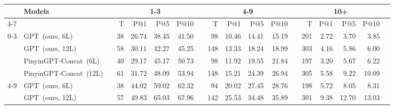 \begin{table*}[!htp]
\scriptsize
\begin{tabular}{llrrrrrrrrrrrrrrrr}\toprule
&\multirow{3}{*}{Models} & &\multicolumn{4}{c}{1-3} & &\multicolumn{4}{c}{4-9} & &\multicolumn{4}{c}{10+} \\\cmidrule{4-7}\cmidrule{9-12}\cmidrule{14-17}
& & &T &P@1 &P@5 &P@10 & &T &P@1 &P@5 &P@10 & &T &P@1 &P@5 &P@10 \\\midrule
\multirow{4}{*}{0-3} &GPT~(ours, 6L) & &38 &26.74 &38.45 &41.50 & &98 &10.46 &14.41 &15.19 & &201 &2.72 &3.70 &3.85 \\
&GPT~(ours, 12L) & &58 &30.11 &42.27 &45.25 & &148 &13.33 &18.24 &18.99 & &303 &4.16 &5.86 &6.00 \\
&PinyinGPT-Concat~(6L) & &40 &29.17 &45.17 &50.73 & &98 &11.92 &19.55 &21.84 & &197 &3.20 &5.67 &6.22 \\
&PinyinGPT-Concat~(12L) & &61 &31.72 &48.09 &53.94 & &148 &15.21 &24.39 &26.94 & &305 &5.58 &9.22 &10.09 \\\midrule
\multirow{4}{*}{4-9} &GPT~(ours, 6L) & &38 &44.02 &59.02 &62.32 & &94 &20.02 &27.45 &28.76 & &198 &5.72 &8.05 &8.31 \\
&GPT~(ours, 12L) & &57 &49.83 &65.03 &67.96 & &142 &25.53 &34.48 &35.89 & &301 &9.38 &12.70 &13.03 \\

\end{tabular}
\end{table*}
